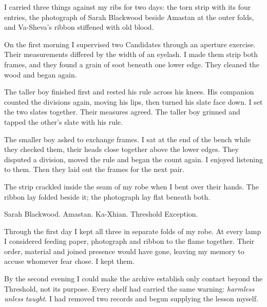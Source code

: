 
I carried three things against my ribs for two days: the torn strip with its four entries, the photograph of Sarah Blackwood beside Amastan at the outer folds, and Va-Sheva's ribbon stiffened with old blood.\par

On the first morning I supervised two Candidates through an aperture exercise. Their measurements differed by the width of an eyelash. I made them strip both frames, and they found a grain of soot beneath one lower edge. They cleaned the wood and began again.\par

The taller boy finished first and rested his rule across his knees. His companion counted the divisions again, moving his lips, then turned his slate face down. I set the two slates together. Their measures agreed. The taller boy grinned and tapped the other's slate with his rule.\par

The smaller boy asked to exchange frames. I sat at the end of the bench while they checked them, their heads close together above the lower edges. They disputed a division, moved the rule and began the count again. I enjoyed listening to them. Then they laid out the frames for the next pair.\par

The strip crackled inside the seam of my robe when I bent over their hands. The ribbon lay folded beside it; the photograph lay flat beneath both.\par

\begin{scripture}
Sarah Blackwood. Amastan. Ka-Xhian. Threshold Exception.
\end{scripture}

Through the first day I kept all three in separate folds of my robe. At every lamp I considered feeding paper, photograph and ribbon to the flame together. Their order, material and joined presence would have gone, leaving my memory to accuse whomever fear chose. I kept them.\par

By the second evening I could make the archive establish only contact beyond the Threshold, not its purpose. Every shelf had carried the same warning: \textit{harmless unless taught}. I had removed two records and begun supplying the lesson myself.\par

